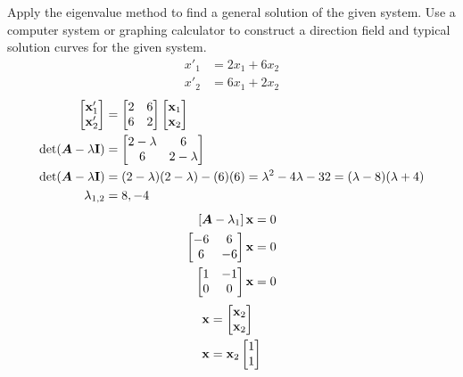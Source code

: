 \documentclass{article}
\begin{document}
Apply the eigenvalue method to find a general solution of the given system. Use a computer system or graphing calculator to construct a direction field and typical solution curves for the given system.
\begin{align*}
	x'_1 & = 2x_1 + 6x_2 \\
	x'_2 & = 6x_1 + 2x_2
\end{align*}
\begin{align*}
	\begin{bmatrix} \vect{x}_1' \\ \vect{x}_2' \end{bmatrix} & =
		\begin{bmatrix} 2 & 6 \\ 6 & 2 \end{bmatrix}
		\begin{bmatrix} \vect{x}_1 \\ \vect{x}_2 \end{bmatrix} \\
	\det( \matr{A} - \lambda \vect{I} ) & =
		\begin{bmatrix}
			2 - \lambda & 6 \\
			6 & 2 - \lambda
		\end{bmatrix} \\
	\det( \matr{A} - \lambda \vect{I} ) & =
		(2 - \lambda)(2 - \lambda) - (6)(6) = \lambda^2 - 4\lambda - 32 = (\lambda - 8)(\lambda + 4) \\
	\lambda_{1,2} & = 8, -4
\end{align*}
\begin{align*}
	\left[ \matr{A} - \lambda_1 \right] \vect{x} & = 0 \\
	\begin{bmatrix}
		-6 & 6 \\
		6 & -6
	\end{bmatrix} \vect{x} & = 0 \\
	\begin{bmatrix}
		1 & -1 \\
		0 & 0
	\end{bmatrix} \vect{x} & = 0
\end{align*}
\begin{align*}
	\vect{x} & = \begin{bmatrix} \vect{x}_2 \\ \vect{x}_2 \end{bmatrix} \\
	\vect{x} & = \vect{x}_2 \begin{bmatrix} 1 \\ 1 \end{bmatrix}
\end{align*}
\end{document}
